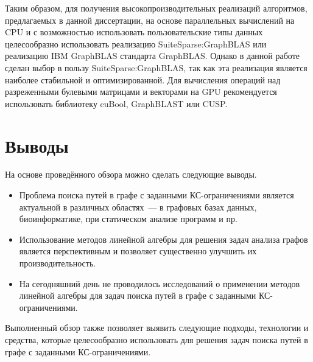 Таким образом, для получения высокопроизводительных реализаций алгоритмов, предлагаемых в данной диссертации, на основе параллельных вычислений на CPU и с возможностью использовать пользовательские типы данных целесообразно использовать реализацию SuiteSparse:GraphBLAS или реализацию IBM GraphBLAS стандарта GraphBLAS. Однако в данной работе сделан выбор в пользу SuiteSparse:GraphBLAS, так как эта реализация является наиболее стабильной и оптимизированной. Для вычисления операций над разреженными булевыми матрицами и векторами на GPU рекомендуется использовать библиотеку cuBool, GraphBLAST или CUSP.







\section{Выводы}\label{sec:ch1/sec8}
На основе проведённого обзора можно сделать следующие выводы.
\begin{itemize}
	\item Проблема поиска путей в графе с заданными КС-ограничениями является актуальной в различных областях~--- в  графовых базах данных, биоинформатике, при статическом анализе программ и пр.
	
	\item Использование методов линейной алгебры для решения задач анализа графов является перспективным и позволяет существенно улучшить их производительность.

	\item На сегодняшний день не проводилось исследований о применении методов линейной алгебры для задач поиска путей в графе с заданными КС-ограничениями.
\end{itemize}

Выполненный обзор также позволяет выявить следующие подходы, технологии и средства, которые целесообразно использовать для решения задач поиска путей в графе с заданными КС-ограничениями.

